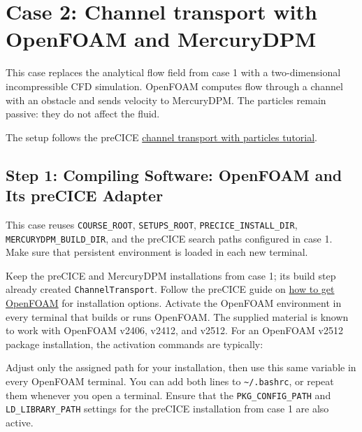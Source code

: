 \section[Channel particle transport]{Case 2: Channel transport with OpenFOAM and MercuryDPM}\label{02-channel-transport-particles__readmemd__case-2-channel-transport-with-openfoam-and-mercurydpm}

This case replaces the analytical flow field from case 1 with a
two-dimensional incompressible CFD simulation. OpenFOAM computes flow
through a channel with an obstacle and sends velocity to MercuryDPM. The
particles remain passive: they do not affect the fluid.

The setup follows the preCICE
\href{https://precice.org/tutorials-channel-transport-particles}{channel
transport with particles tutorial}.

\subsection{Step 1: Compiling Software: OpenFOAM and Its preCICE
Adapter}\label{02-channel-transport-particles__readmemd__step-1-compiling-software-openfoam-and-its-precice-adapter}

This case reuses \nolinkurl{COURSE_ROOT}, \nolinkurl{SETUPS_ROOT},
\nolinkurl{PRECICE_INSTALL_DIR}, \nolinkurl{MERCURYDPM_BUILD_DIR}, and
the preCICE search paths configured in case 1. Make sure that persistent
environment is loaded in each new terminal.

Keep the preCICE and MercuryDPM installations from case 1; its build
step already created \nolinkurl{ChannelTransport}. Follow the preCICE
guide on
\href{https://precice.org/adapter-openfoam-support.html\#how-to-get-openfoam}{how
to get OpenFOAM} for installation options. Activate the OpenFOAM
environment in every terminal that builds or runs OpenFOAM. The supplied
material is known to work with OpenFOAM v2406, v2412, and v2512. For an
OpenFOAM v2512 package installation, the activation commands are
typically:

\noindent\begin{minipage}{\linewidth}
\end{minipage}

Adjust only the assigned path for your installation, then use this same
variable in every OpenFOAM terminal. You can add both lines to
\nolinkurl{~/.bashrc}, or repeat them whenever you open a terminal.
Ensure that the \nolinkurl{PKG_CONFIG_PATH} and
\nolinkurl{LD_LIBRARY_PATH} settings for the preCICE installation from
case 1 are also active.

